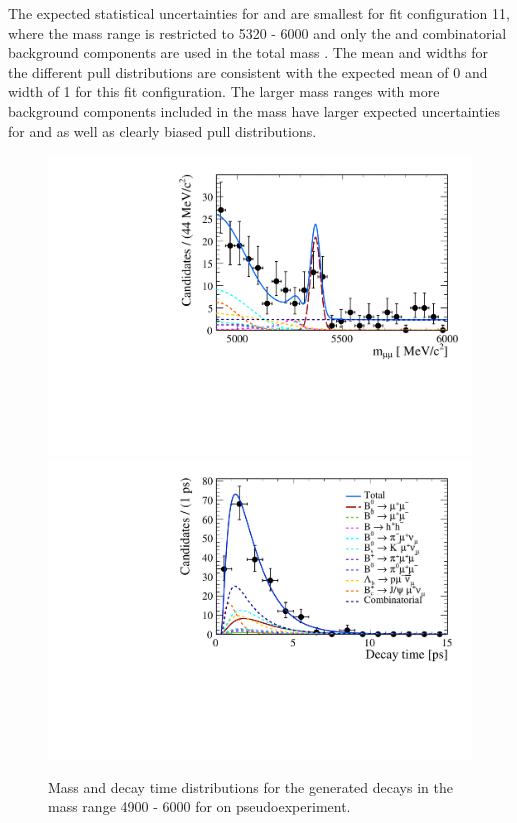The expected statistical uncertainties for \tmumu and \Gmumu are smallest for fit configuration 11, where the mass range is restricted to 5320 - 6000 \mevcc and only the \bsmumu and combinatorial background components are used in the total mass \pdf. The mean and widths for the different pull distributions are consistent with the expected mean of 0 and width of 1 for this fit configuration. The larger mass ranges with more background components included in the mass \pdf have larger expected uncertainties for \tmumu and \Gmumu as well as clearly biased pull distributions. %

\begin{figure}[hp]
    \centering
        \includegraphics[width= 0.7 \textwidth]{./Figs/LifetimeMeasurement/generated_mass.pdf}
        \includegraphics[width= 0.7 \textwidth]{./Figs/LifetimeMeasurement/generated_DT.pdf}
 
    \caption{Mass and decay time distributions for the generated decays in the mass range 4900 - 6000 for on pseudoexperiment.}
    \label{fig:toygen}
\end{figure}

